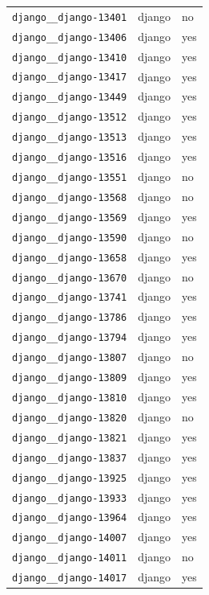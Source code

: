 \begin{longtable}{@{}p{}lp{}@{}}
\texttt{django\_\_django-13401} & django & no \\
\texttt{django\_\_django-13406} & django & yes \\
\texttt{django\_\_django-13410} & django & yes \\
\texttt{django\_\_django-13417} & django & yes \\
\texttt{django\_\_django-13449} & django & yes \\
\texttt{django\_\_django-13512} & django & yes \\
\texttt{django\_\_django-13513} & django & yes \\
\texttt{django\_\_django-13516} & django & yes \\
\texttt{django\_\_django-13551} & django & no \\
\texttt{django\_\_django-13568} & django & no \\
\texttt{django\_\_django-13569} & django & yes \\
\texttt{django\_\_django-13590} & django & no \\
\texttt{django\_\_django-13658} & django & yes \\
\texttt{django\_\_django-13670} & django & no \\
\texttt{django\_\_django-13741} & django & yes \\
\texttt{django\_\_django-13786} & django & yes \\
\texttt{django\_\_django-13794} & django & yes \\
\texttt{django\_\_django-13807} & django & no \\
\texttt{django\_\_django-13809} & django & yes \\
\texttt{django\_\_django-13810} & django & yes \\
\texttt{django\_\_django-13820} & django & no \\
\texttt{django\_\_django-13821} & django & yes \\
\texttt{django\_\_django-13837} & django & yes \\
\texttt{django\_\_django-13925} & django & yes \\
\texttt{django\_\_django-13933} & django & yes \\
\texttt{django\_\_django-13964} & django & yes \\
\texttt{django\_\_django-14007} & django & yes \\
\texttt{django\_\_django-14011} & django & no \\
\texttt{django\_\_django-14017} & django & yes \\

\end{longtable}
